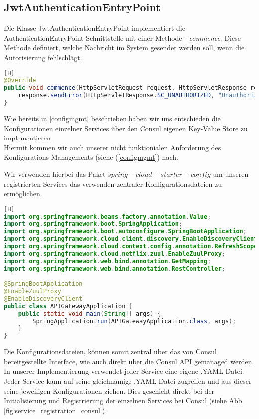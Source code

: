 \subsection{JwtAuthenticationEntryPoint}
Die Klasse JwtAuthenticationEntryPoint implementiert die AuthenticationEntryPoint-Schnittstelle mit einer Methode - \textit{commence}. Diese Methode definiert, welche Nachricht im System gesendet werden soll, wenn die Autorisierung fehlschlägt.
\begin{lstlisting}[language=JAVA,caption=JwtAuthenticationEntryPoint.java][H]
@Override
public void commence(HttpServletRequest request, HttpServletResponse response, AuthenticationException authException) throws IOException {
    response.sendError(HttpServletResponse.SC_UNAUTHORIZED, "Unauthorized");
}
\end{lstlisting}
 \newpage
{}

Wie bereits in \ref{configmgmt} beschrieben haben wir uns entschieden die Konfigurationen einzelner Services über den Consul eigenen Key-Value Store zu implementieren. \\
Hiermit kommen wir auch unserer nicht funktionialen Anforderung des Konfigurations-Managements (siehe (\ref{configmgmt}) nach.

Wir verwenden hierbei das Paket $spring-cloud-starter-config$ um unseren registrierten Services das verwenden zentraler Konfigurationsdateien zu ermöglichen.

\begin{lstlisting}[language=JAVA,caption=APIGatewayApplication.java][H]
import org.springframework.beans.factory.annotation.Value;
import org.springframework.boot.SpringApplication;
import org.springframework.boot.autoconfigure.SpringBootApplication;
import org.springframework.cloud.client.discovery.EnableDiscoveryClient;
import org.springframework.cloud.context.config.annotation.RefreshScope;
import org.springframework.cloud.netflix.zuul.EnableZuulProxy;
import org.springframework.web.bind.annotation.GetMapping;
import org.springframework.web.bind.annotation.RestController;

@SpringBootApplication
@EnableZuulProxy
@EnableDiscoveryClient
public class APIGatewayApplication {
	public static void main(String[] args) {
		SpringApplication.run(APIGatewayApplication.class, args);
	}
}
\end{lstlisting}

Die Konfigurationsdateien, können somit zentral über das von Consul bereitgestellte Interface, wie auch direkt über die Consul API gemanaged werden. In unserer Implementierung verwendet jeder Service eine eigene .YAML-Datei. Jeder Service kann auf seine gleichnamige .YAML Datei zugreifen und aus dieser seine jeweiligen Konfigurationen ziehen. Dies geschieht direkt bei der Initialisierung und Registrierung der einzelnen Services bei Consul (siehe Abb. \ref{fig:service_registration_consul}).


